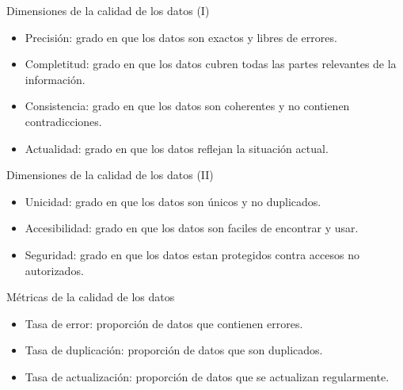\documentclass{beamer}
\begin{document}
\begin{frame}{Dimensiones de la calidad de los datos (I)}
    \begin{itemize}
        \item Precisión: grado en que los datos son exactos y libres de errores.
        \item Completitud: grado en que los datos cubren todas las partes relevantes de la información.
        \item Consistencia: grado en que los datos son coherentes y no contienen contradicciones.
        \item Actualidad: grado en que los datos reflejan la situación actual.
    \end{itemize}
\end{frame}

\begin{frame}{Dimensiones de la calidad de los datos (II)}
    \begin{itemize}
        \item Unicidad: grado en que los datos son únicos y no duplicados.
        \item Accesibilidad: grado en que los datos son faciles de encontrar y usar.
        \item Seguridad: grado en que los datos estan protegidos contra accesos no autorizados.
    \end{itemize}
\end{frame}

\begin{frame}{Métricas de la calidad de los datos}
    \begin{itemize}
        \item [{\makebox[1em][c]{\textcolor{black}{\faExclamationTriangle}}}] Tasa de error: proporción de datos que contienen errores.
        \item [{\makebox[1em][c]{\textcolor{black}{\faClone}}}] Tasa de duplicación: proporción de datos que son duplicados.
        \item [{\makebox[1em][c]{\textcolor{black}{\faRefresh}}}] Tasa de actualización: proporción de datos que se actualizan regularmente.
    \end{itemize}
\end{frame}
\end{document}
